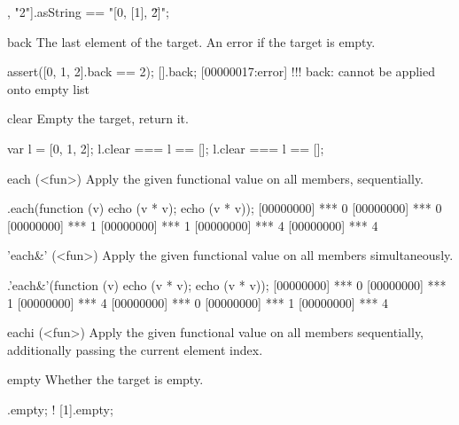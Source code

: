 \begin{urbiscriptapi}
\begin{urbiassert}
[0, [1], "2"].asString == "[0, [1], \"2\"]";
\end{urbiassert}


\item[back]
  The last element of the target. An error if the target is empty.

\begin{urbiscript}
assert([0, 1, 2].back == 2);
[].back;
[00000017:error] !!! back: cannot be applied onto empty list
\end{urbiscript}


\item[clear]
  Empty the target, return it.

\begin{urbiassert}
var l = [0, 1, 2];
l.clear === l == [];
l.clear === l == [];
\end{urbiassert}


\item[each](<fun>)%
  Apply the given functional value  on all members, sequentially.

\begin{urbiscript}
[0, 1, 2].each(function (v) {echo (v * v); echo (v * v)});
[00000000] *** 0
[00000000] *** 0
[00000000] *** 1
[00000000] *** 1
[00000000] *** 4
[00000000] *** 4
\end{urbiscript}


\item['each&'](<fun>)%
Apply the given functional value on all members simultaneously.

\begin{urbiscript}
[0, 1, 2].'each&'(function (v) {echo (v * v); echo (v * v)});
[00000000] *** 0
[00000000] *** 1
[00000000] *** 4
[00000000] *** 0
[00000000] *** 1
[00000000] *** 4
\end{urbiscript}


\item[eachi](<fun>)%
  Apply the given functional value  on all members
  sequentially, additionally passing the current element index.



\item[empty]
  Whether the target is empty.

\begin{urbiassert}
   [].empty;
! [1].empty;
\end{urbiassert}



\end{urbiscriptapi}
